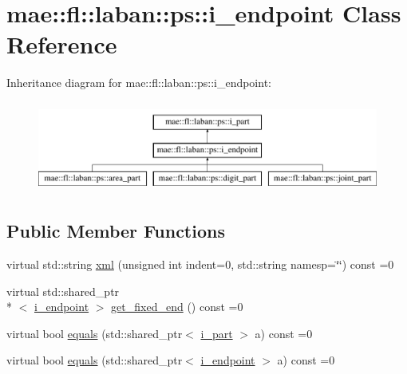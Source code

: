 \hypertarget{classmae_1_1fl_1_1laban_1_1ps_1_1i__endpoint}{\section{mae\-:\-:fl\-:\-:laban\-:\-:ps\-:\-:i\-\_\-endpoint Class Reference}
\label{classmae_1_1fl_1_1laban_1_1ps_1_1i__endpoint}
}
Inheritance diagram for mae\-:\-:fl\-:\-:laban\-:\-:ps\-:\-:i\-\_\-endpoint\-:\begin{figure}[H]
\begin{center}
\leavevmode
\includegraphics[height=3.000000cm]{classmae_1_1fl_1_1laban_1_1ps_1_1i__endpoint}
\end{center}
\end{figure}
\subsection*{Public Member Functions}
\begin{DoxyCompactItemize}
\item 
virtual std\-::string \hyperlink{classmae_1_1fl_1_1laban_1_1ps_1_1i__endpoint_a1af7dbd05400cbdd7f9f45ef75dd38d6}{xml} (unsigned int indent=0, std\-::string namesp=\char`\"{}\char`\"{}) const =0
\item 
virtual std\-::shared\-\_\-ptr\\*
$<$ \hyperlink{classmae_1_1fl_1_1laban_1_1ps_1_1i__endpoint}{i\-\_\-endpoint} $>$ \hyperlink{classmae_1_1fl_1_1laban_1_1ps_1_1i__endpoint_a0938824cc5892b072636c3b52352b3f2}{get\-\_\-fixed\-\_\-end} () const =0
\item 
virtual bool \hyperlink{classmae_1_1fl_1_1laban_1_1ps_1_1i__endpoint_abc675b07d3ce69fbec362b2e792a1e06}{equals} (std\-::shared\-\_\-ptr$<$ \hyperlink{classmae_1_1fl_1_1laban_1_1ps_1_1i__part}{i\-\_\-part} $>$ a) const =0
\item 
virtual bool \hyperlink{classmae_1_1fl_1_1laban_1_1ps_1_1i__endpoint_aeffb14c43728d2ef094122f3d0278455}{equals} (std\-::shared\-\_\-ptr$<$ \hyperlink{classmae_1_1fl_1_1laban_1_1ps_1_1i__endpoint}{i\-\_\-endpoint} $>$ a) const =0
\end{DoxyCompactItemize}


